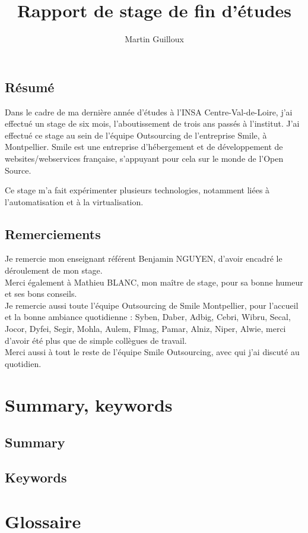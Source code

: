 \documentclass[14 pt]{extreport}
\title{\textbf{Rapport de stage de fin d'études}}
\author{Martin Guilloux}
\begin{document}
\maketitle

\section*{Résumé}
Dans le cadre de ma dernière année d'études à l'INSA Centre-Val-de-Loire, j'ai effectué un stage de six mois, l'aboutissement de trois ans passés à l'institut. J'ai effectué ce stage au sein de l'équipe Outsourcing de l'entreprise Smile, à Montpellier. Smile est une entreprise d'hébergement et de développement de websites/webservices française, s'appuyant pour cela sur le monde de l'Open Source.

Ce stage m'a fait expérimenter plusieurs technologies, notamment liées à l'automatisation et à la virtualisation.

\section*{Remerciements}
Je remercie mon enseignant référent Benjamin NGUYEN, d'avoir encadré le déroulement de mon stage.\\
Merci également à Mathieu BLANC, mon maître de stage, pour sa bonne humeur et ses bons conseils.\\
Je remercie aussi toute l'équipe Outsourcing de Smile Montpellier, pour l'accueil et la bonne ambiance quotidienne : Syben, Daber, Adbig, Cebri, Wibru, Secal, Jocor, Dyfei, Segir, Mohla, Aulem, Flmag, Pamar, Alniz, Niper, Alwie, merci d'avoir été plus que de simple collègues de travail.\\
Merci aussi à tout le reste de l'équipe Smile Outsourcing, avec qui j'ai discuté au quotidien.


\tableofcontents

\chapter*{Summary, keywords}
\section*{Summary}
\lipsum[1]\lipsum[1]
\section*{Keywords}
\lipsum[1]


\chapter*{Glossaire}
\end{document}
